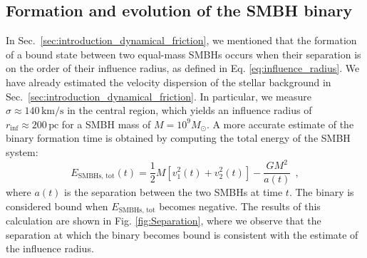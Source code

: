 \documentclass[fleqn,usenatbib]{mnras}
\begin{document}
\subsection{Formation and evolution of the SMBH binary}\label{sec:analysis_binary}
In Sec.~\ref{sec:introduction_dynamical_friction}, we mentioned that the formation of a bound state between two equal-mass SMBHs occurs when their separation is on the order of their influence radius, as defined in Eq. \ref{eq:influence_radius}.
We have already estimated the velocity dispersion of the stellar background in Sec.~\ref{sec:introduction_dynamical_friction}.
In particular, we measure $\sigma \approx 140 \,\text{km/s}$ in the central region, which yields an influence radius of $r_\text{inf} \approx 200 \,\text{pc}$ for a SMBH mass of $M=10^9 M_\odot$.
A more accurate estimate of the binary formation time is obtained by computing the total energy of the SMBH system:
\begin{equation}
    E_\text{SMBHs, tot}(t) = \dfrac{1}{2} M \left[v_1^2(t) + v_2^2(t)\right] - \dfrac{GM^2}{a(t)} \:\: ,
    \label{eq:total_energy_SMBHs}
\end{equation}
where $a(t)$ is the separation between the two SMBHs at time $t$.
The binary is considered bound when $E_\text{SMBHs, tot}$ becomes negative.
The results of this calculation are shown in Fig. \ref{fig:Separation}, where we observe that the separation at which the binary becomes bound is consistent with the estimate of the influence radius.
\vspace{0.5em}
\end{document}
